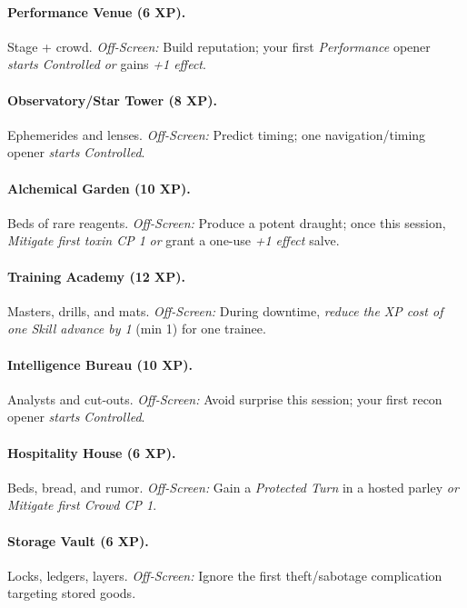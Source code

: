 \documentclass[11pt]{article}
\begin{document}
\paragraph{Performance Venue (6 XP).} Stage + crowd.
\emph{Off-Screen:} Build reputation; your first \emph{Performance} opener \emph{starts Controlled} \emph{or} gains \emph{+1 effect}.

\paragraph{Observatory/Star Tower (8 XP).} Ephemerides and lenses.
\emph{Off-Screen:} Predict timing; one navigation/timing opener \emph{starts Controlled}.

\paragraph{Alchemical Garden (10 XP).} Beds of rare reagents.
\emph{Off-Screen:} Produce a potent draught; once this session, \emph{Mitigate first toxin CP 1} \emph{or} grant a one-use \emph{+1 effect} salve.

\paragraph{Training Academy (12 XP).} Masters, drills, and mats.
\emph{Off-Screen:} During downtime, \emph{reduce the XP cost of one Skill advance by 1} (min 1) for one trainee.

\paragraph{Intelligence Bureau (10 XP).} Analysts and cut-outs.
\emph{Off-Screen:} Avoid surprise this session; your first recon opener \emph{starts Controlled}.

\paragraph{Hospitality House (6 XP).} Beds, bread, and rumor.
\emph{Off-Screen:} Gain a \emph{Protected Turn} in a hosted parley \emph{or} \emph{Mitigate first Crowd CP 1}.

\paragraph{Storage Vault (6 XP).} Locks, ledgers, layers.
\emph{Off-Screen:} Ignore the first theft/sabotage complication targeting stored goods.
\end{document}
